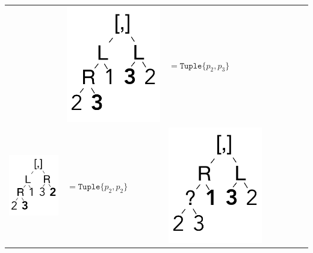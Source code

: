 \documentclass[a4paper,english]{lipics-v2019}
\newcommand{\xt}[1]{\texttt{#1}}
\newcommand{\tuple}[1]{\xt{Tuple\{}#1\xt{\}}}
\begin{document}
{\begin{tabular}{@{}l@{~}ll@{~}ll@{~}ll@{~}l}
&\begin{minipage}{1.2cm}\includegraphics[scale=.25]{figures/tree4.pdf} 
\end{minipage} &  $ =   \tuple{p_2,p_3} $ \\
\begin{minipage}{1.2cm}\includegraphics[scale=.25]{figures/tree5.pdf} 
\end{minipage} &  $ =   \tuple{p_2,p_2} $  &
\begin{minipage}{1.2cm}\includegraphics[scale=.25]{figures/tree6.pdf} 

\end{minipage}
\end{tabular}}
\end{document}
